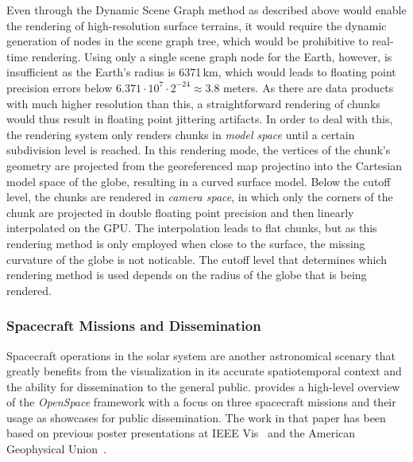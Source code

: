Even through the Dynamic Scene Graph method as described above would enable the rendering of high-resolution surface terrains, it would require the dynamic generation of nodes in the scene graph tree, which would be prohibitive to real-time rendering.  Using only a single scene graph node for the Earth, however, is insufficient as the Earth's radius is 6371\,km, which would leads to floating point precision errors below $6.371\cdot 10^7 \cdot 2^{-24} \approx 3.8$ meters.  As there are data products with much higher resolution than this, a straightforward rendering of chunks would thus result in floating point jittering artifacts.  In order to deal with this, the rendering system only renders chunks in \emph{model space} until a certain subdivision level is reached.  In this rendering mode, the vertices of the chunk's geometry are projected from the georeferenced map projectino into the Cartesian model space of the globe, resulting in a curved surface model.  Below the cutoff level, the chunks are rendered in \emph{camera space}, in which only the corners of the chunk are projected in double floating point precision and then linearly interpolated on the GPU.  The interpolation leads to flat chunks, but as this rendering method is only employed when close to the surface, the missing curvature of the globe is not noticable.  The cutoff level that determines which rendering method is used depends on the radius of the globe that is being rendered.




\subsubsection{Spacecraft Missions and Dissemination} \label{contributions:astro:sc}
Spacecraft operations in the solar system are another astronomical scenary that greatly benefits from the visualization in its accurate spatiotemporal context and the ability for dissemination to the general public.   provides a high-level overview of the \emph{OpenSpace} framework with a focus on three spacecraft missions and their usage as showcases for public dissemination.  The work in that paper has been based on previous poster presentations at IEEE Vis~\cite{bock15openspace} and the American Geophysical Union~\cite{bock15bopenspace}.

